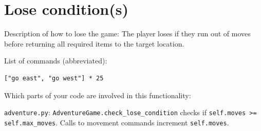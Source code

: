 \documentclass[11pt]{article}
\begin{document}
\section*{Lose condition(s)}
Description of how to lose the game: The player loses if they run out of moves before returning all required items to the target location.

List of commands (abbreviated):
\begin{verbatim}
["go east", "go west"] * 25
\end{verbatim}

Which parts of your code are involved in this functionality: 

\texttt{adventure.py}: \texttt{AdventureGame.check\_lose\_condition} checks if \texttt{self.moves >= self.max\_moves}. Calls to movement commands increment \texttt{self.moves}.
\end{document}

